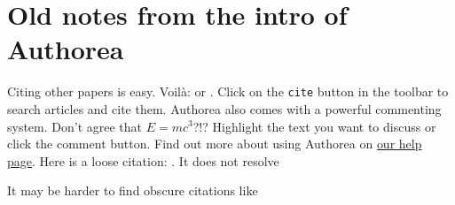 \section{Old notes from the intro of Authorea}

Citing other papers is easy. Voilà: \cite{2012} or \cite{Holstein_2009}. Click on the \verb|cite| button in the toolbar to search articles and cite them. Authorea also comes with a powerful commenting system. Don't agree that $E  =  mc^{3}$?!? Highlight the text you want to discuss or click the comment button. Find out more about using Authorea on \href{https://www.authorea.com/help}{our help page}. Here is a loose citation: \cite{Hogeweg_2011}. It does not resolve\ldot
 
It may be harder to find obscure citations like \cite{HH78}
  
  
  
  
  
  
  